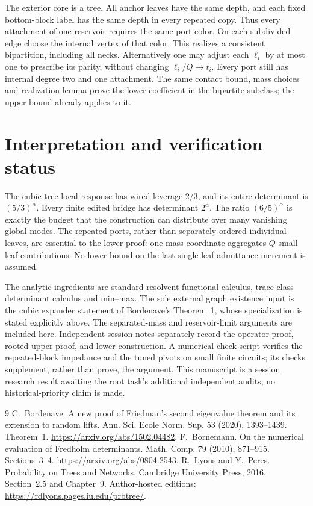 \documentclass[11pt]{article}
\begin{document}
The exterior core is a tree. All anchor leaves have the same depth,
and each fixed bottom-block label has the same depth in every repeated
copy. Thus every attachment of one reservoir requires the same port
color. On each subdivided edge choose the internal vertex of that
color. This realizes a consistent bipartition, including all necks.
Alternatively one may adjust each $\ell_i$ by at most one to prescribe
its parity, without changing $\ell_i/Q\to t_i$. Every port still has
internal degree two and one attachment. The same contact bound, mass
choices and realization lemma prove the lower coefficient in the
bipartite subclass; the upper bound already applies to it.

\section{Interpretation and verification status}
The cubic-tree local response has wired leverage $2/3$, and its
entire determinant is $(5/3)^\alpha$. Every finite edited bridge has
determinant $2^\alpha$. The ratio $(6/5)^\alpha$ is exactly the budget
that the construction can distribute over many vanishing global modes.
The repeated ports, rather than separately ordered individual leaves,
are essential to the lower proof: one mass coordinate aggregates $Q$
small leaf contributions. No lower bound on the last single-leaf
admittance increment is assumed.

The analytic ingredients are standard resolvent functional calculus,
trace-class determinant calculus and min--max. The sole external graph
existence input is the cubic expander statement of Bordenave's
Theorem~1, whose specialization is stated explicitly above. The
separated-mass and reservoir-limit arguments are included here.
Independent session notes separately record the operator proof,
rooted upper proof, and lower construction. A numerical check script
verifies the repeated-block impedance and the tuned pivots on small
finite circuits; its checks supplement, rather than prove, the argument.
This manuscript is a session research result awaiting the root task's
additional independent audits; no historical-priority claim is made.

\begin{thebibliography}{9}
 C.~Bordenave. A new proof of Friedman's second
eigenvalue theorem and its extension to random lifts. Ann. Sci. Ecole
Norm. Sup. 53 (2020), 1393--1439. Theorem~1.
\url{https://arxiv.org/abs/1502.04482}.
 F.~Bornemann. On the numerical evaluation of Fredholm
determinants. Math. Comp. 79 (2010), 871--915. Sections~3--4.
\url{https://arxiv.org/abs/0804.2543}.
 R.~Lyons and Y.~Peres. Probability on Trees and
Networks. Cambridge University Press, 2016. Section~2.5 and Chapter~9.
Author-hosted editions: \url{https://rdlyons.pages.iu.edu/prbtree/}.
\end{thebibliography}
\end{document}
